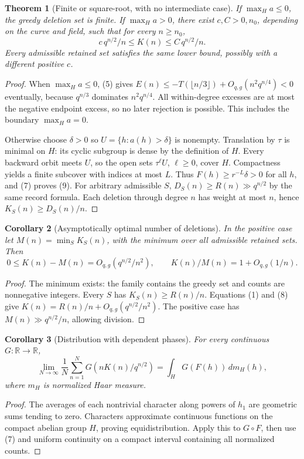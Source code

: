\documentclass[11pt]{article}
\newtheorem{theorem}{Theorem}[section]
\newtheorem{corollary}[theorem]{Corollary}
\begin{document}
\begin{theorem}[Finite or square-root, with no intermediate case]\label{thm:dichotomy}
If \(\max_H a\leq0\), the greedy deletion set is finite.
If \(\max_H a>0\), there exist \(c,C>0,n_0\), depending on the curve
and field, such that for every \(n\geq n_0\),
\[
 c\,q^{n/2}/n\leq K(n)\leq C\,q^{n/2}/n.          \tag{9}
\]
Every admissible retained set satisfies the same lower bound,
possibly with a different positive \(c\).
\end{theorem}
\begin{proof}
When \(\max_Ha\leq0\), (5) gives
\(E(n)\leq-T(\lfloor n/3\rfloor)+O_{q,g}(n^2q^{n/4})<0\)
eventually, because \(q^{n/3}\) dominates \(n^2q^{n/4}\).
All within-degree excesses are at most the negative endpoint excess,
so no later rejection is possible. This includes the boundary
\(\max_Ha=0\).

Otherwise choose \(\delta>0\) so \(U=\{h:a(h)>\delta\}\) is nonempty.
Translation by \(\tau\) is minimal on \(H\): its cyclic subgroup
is dense by the definition of \(H\). Every backward orbit meets \(U\),
so the open sets \(\tau^\ell U\), \(\ell\geq0\), cover \(H\).
Compactness yields a finite subcover with indices at most \(L\).
Thus \(F(h)\geq r^{-L}\delta>0\) for all \(h\), and (7) proves (9).
For arbitrary admissible \(S\),
\(D_S(n)\geq R(n)\gg q^{n/2}\) by the same record formula.
Each deletion through degree \(n\) has weight at most \(n\), hence
\(K_S(n)\geq D_S(n)/n\).
\end{proof}

\begin{corollary}[Asymptotically optimal number of deletions]\label{cor:optimal}
In the positive case let \(M(n)=\min_S K_S(n)\), with the minimum over
all admissible retained sets. Then
\[
 0\leq K(n)-M(n)=O_{q,g}(q^{n/2}/n^2),\qquad
 K(n)/M(n)=1+O_{q,g}(1/n).
\]
\end{corollary}
\begin{proof}
The minimum exists: the family contains the greedy set and counts
are nonnegative integers. Every \(S\) has \(K_S(n)\geq R(n)/n\).
Equations (1) and (8) give
\(K(n)=R(n)/n+O_{q,g}(q^{n/2}/n^2)\).
The positive case has \(M(n)\gg q^{n/2}/n\), allowing division.
\end{proof}

\begin{corollary}[Distribution with dependent phases]
For every continuous \(G:\mathbb R\to\mathbb R\),
\[
 \lim_{N\to\infty}\frac1N\sum_{n=1}^N
 G(nK(n)/q^{n/2})=\int_HG(F(h))\,dm_H(h),
\]
where \(m_H\) is normalized Haar measure.
\end{corollary}
\begin{proof}
The averages of each nontrivial character along powers of \(h_1\)
are geometric sums tending to zero. Characters approximate continuous
functions on the compact abelian group \(H\), proving equidistribution.
Apply this to \(G\circ F\), then use (7) and uniform continuity on
a compact interval containing all normalized counts.
\end{proof}
\end{document}
